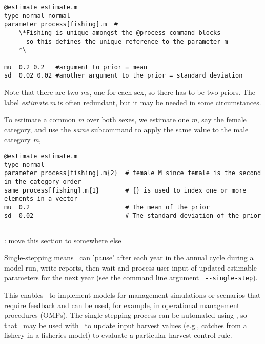 {\small{\begin{verbatim}
@estimate estimate.m
type normal normal
parameter process[fishing].m  #
    \*Fishing is unique amongst the @process command blocks
      so this defines the unique reference to the parameter m
    *\

mu  0.2 0.2   #argument to prior = mean
sd  0.02 0.02 #another argument to the prior = standard deviation
\end{verbatim}}}

Note that there are two \textit{m}s, one for each sex, so there has to be two priors. The \textit{\@estiamte} label \textit{estimate.m} is often redundant, but it may be needed in some circumstances.

To estimate a common \textit{m} over both sexes, we estimate one \textit{m}, say the female category, and use the \textit{same} subcommand to apply the same value to the male category \textit{m},

{\small{\begin{verbatim}
@estimate estimate.m
type normal
parameter process[fishing].m{2}  # female M since female is the second in the category order
same process[fishing].m{1}       # {} is used to index one or more elements in a vector
mu  0.2                          # The mean of the prior
sd  0.02                         # The standard deviation of the prior
\end{verbatim}}}

\subsection{\label{sec:SingleStepping}}

\TODO: move this section to somewhere else

Single-stepping means \CNAME\ can 'pause' after each year in the annual cycle during a model run, write reports, then wait and process user input of updated estimable parameters for the next year (see the command line argument \texttt{ -{}-single-step}).

This enables \CNAME\ to implement models for management simulations or scenarios that require feedback and can be used, for example, in operational management procedures (OMPs). The single-stepping process can be automated using \R, so that \CNAME\ may be used with \R\ to update input harvest values (e.g., catches from a fishery in a fisheries model) to evaluate a particular harvest control rule.

